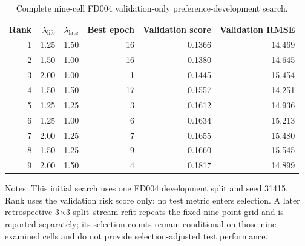 \begin{table}[!htbp]
\centering
\caption{Complete nine-cell FD004 validation-only preference-development search.}
\label{tab:fd004-preference-search}
\small
\begin{tabular}{rrrrrr}
\toprule
Rank & $\lambda_{\mathrm{life}}$ & $\lambda_{\mathrm{late}}$ & Best epoch & Validation score & Validation RMSE \\
\midrule
1 & 1.25 & 1.50 & 16 & 0.1366 & 14.469 \\
2 & 1.50 & 1.00 & 16 & 0.1380 & 14.645 \\
3 & 2.00 & 1.00 & 1 & 0.1445 & 15.454 \\
4 & 1.50 & 1.50 & 17 & 0.1557 & 14.251 \\
5 & 1.25 & 1.25 & 3 & 0.1612 & 14.936 \\
6 & 1.25 & 1.00 & 6 & 0.1634 & 15.213 \\
7 & 2.00 & 1.25 & 7 & 0.1655 & 15.480 \\
8 & 1.50 & 1.25 & 9 & 0.1660 & 15.545 \\
9 & 2.00 & 1.50 & 4 & 0.1817 & 14.899 \\
\bottomrule
\end{tabular}
\begin{minipage}{0.98\linewidth}\footnotesize Notes: This initial search uses one FD004 development split and seed 31415. Rank uses the validation risk score only; no test metric enters selection. A later retrospective 3$\times$3 split--stream refit repeats the fixed nine-point grid and is reported separately; its selection counts remain conditional on those nine examined cells and do not provide selection-adjusted test performance.\end{minipage}
\end{table}
